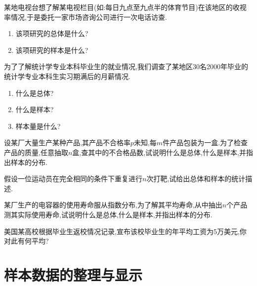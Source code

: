 \begin{xiti}
\item 某地电视台想了解某电视栏目(如:每日九点至九点半的体育节目)在该地区的收视率情况,于是委托一家市场咨询公司进行一次电话访查.
\begin{enumerate}
\item 该项研究的总体是什么?
\item 该项研究的样本是什么?
\end{enumerate}
\item 为了了解统计学专业本科毕业生的就业情况,我们调查了某地区30名2000年毕业的统计学专业本科生实习期满后的月薪情况.
\begin{enumerate}
\item 什么是总体?
\item 什么是样本?
\item 样本量是什么?
\end{enumerate}
\item 设某厂大量生产某种产品,其产品不合格率$p$未知,每$m$件产品包装为一盒.为了检查产品的质量,任意抽取$n$盒,查其中的不合格品数,试说明什么是总体,什么是样本,并指出样本的分布.
\item 假设一位运动员在完全相同的条件下重复进行$n$次打靶,试给出总体和样本的统计描述.
\item 某厂生产的电容器的使用寿命服从指数分布,为了解其平均寿命,从中抽出$n$个产品测其实际使用寿命,试说明什么是总体,什么是样本,并指出样本的分布.
\item 美国某高校根据毕业生返校情况记录,宣布该校毕业生的年平均工资为5万美元,你对此有何平均?
\end{xiti}
\section{样本数据的整理与显示\label{sec:5.2}}
